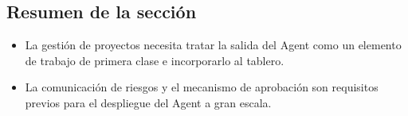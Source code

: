 \subsection{Resumen de la sección}
\begin{itemize}
    \item La gestión de proyectos necesita tratar la salida del Agent como un elemento de trabajo de primera clase e incorporarlo al tablero.
    \item La comunicación de riesgos y el mecanismo de aprobación son requisitos previos para el despliegue del Agent a gran escala.
\end{itemize}

